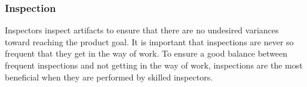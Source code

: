 \subsubsection{Inspection}


Inspectors inspect artifacts to ensure that there are no undesired variances toward reaching
the product goal\cite{scrumguide11}. It is important that inspections are never so frequent
that they get in the way of work\cite{scrumguide11}. To ensure a good balance between
frequent inspections and not getting in the way of work, inspections are the most beneficial
when they are performed by skilled inspectors\cite{scrumguide11}.
